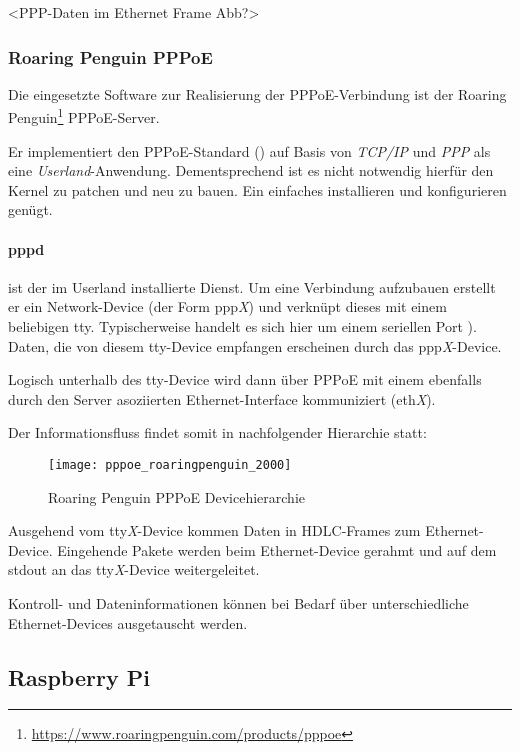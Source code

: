 <PPP-Daten im Ethernet Frame Abb?>

\subsubsection{Roaring Penguin PPPoE}
Die eingesetzte Software zur Realisierung der PPPoE-Verbindung ist der
Roaring Penguin\footnote{\url{https://www.roaringpenguin.com/products/pppoe}} PPPoE-Server.

Er implementiert den PPPoE-Standard () auf Basis
von \textit{TCP/IP} und \textit{PPP} als eine \textit{Userland}-Anwendung.
Dementsprechend ist es nicht notwendig hierfür den Kernel zu patchen und neu zu bauen.
Ein einfaches installieren und konfigurieren genügt.

\paragraph{pppd}
ist der im Userland installierte Dienst. Um eine Verbindung aufzubauen
erstellt er ein Network-Device (der Form ppp\textit{X}) und verknüpt dieses
mit einem beliebigen tty.
Typischerweise handelt es sich hier um einem seriellen Port \cite{roaringpenguinpres}).
Daten, die von diesem tty-Device empfangen erscheinen durch das ppp\textit{X}-Device.

Logisch unterhalb des tty-Device wird dann über PPPoE mit einem ebenfalls durch den Server
asoziierten Ethernet-Interface kommuniziert (eth\textit{X}).

Der Informationsfluss findet somit in nachfolgender Hierarchie statt:
 \begin{figure}[htp]
  \begin{center}
   \texttt{[image: pppoe\_roaringpenguin\_2000]}
  \end{center}
  \caption[Roaring Penguin PPPoE Devicehierarchie]{Roaring Penguin PPPoE Devicehierarchie \cite{roaringpenguinpres}}
  \label{fig:pppoe_roaringpenguin_devicehierarchy}
 \end{figure}

Ausgehend vom tty\textit{X}-Device kommen Daten in \ac{HDLC}-Frames zum Ethernet-Device.
Eingehende Pakete werden beim Ethernet-Device gerahmt und auf dem stdout an
das tty\textit{X}-Device weitergeleitet.

Kontroll- und Dateninformationen können bei Bedarf über unterschiedliche
Ethernet-Devices ausgetauscht werden.

\subsection{Raspberry Pi}

